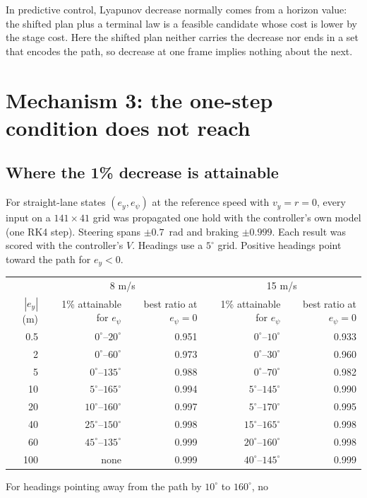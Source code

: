 \documentclass[11pt]{article}
\begin{document}
In predictive control, Lyapunov decrease normally comes from a horizon value:
the shifted plan plus a terminal law is a feasible candidate whose cost is lower
by the stage cost. Here the shifted plan neither carries the decrease nor ends
in a set that encodes the path, so decrease at one frame implies nothing about
the next.

\section{Mechanism 3: the one-step condition does not reach}
\subsection{Where the 1\% decrease is attainable}
For straight-lane states $(e_y,e_\psi)$ at the reference speed with $v_y=r=0$,
every input on a $141\times41$ grid was propagated one hold with the
controller's own model (one RK4 step). Steering spans $\pm0.7$~rad and braking
$\pm0.999$. Each result was scored with the controller's $V$. Headings use a
$5^\circ$ grid. Positive headings point toward the path for $e_y<0$.
\begin{center}\footnotesize
\begin{tabular}{rrrrr}
\toprule
 & \multicolumn{2}{c}{8 m/s} & \multicolumn{2}{c}{15 m/s}\\
$|e_y|$ (m) & 1\% attainable for $e_\psi$ & best ratio at $e_\psi=0$ & 1\% attainable for $e_\psi$ & best ratio at $e_\psi=0$\\
\midrule
0.5 & $0^\circ$--$20^\circ$ & 0.951 & $0^\circ$--$10^\circ$ & 0.933\\
2 & $0^\circ$--$60^\circ$ & 0.973 & $0^\circ$--$30^\circ$ & 0.960\\
5 & $0^\circ$--$135^\circ$ & 0.988 & $0^\circ$--$70^\circ$ & 0.982\\
10 & $5^\circ$--$165^\circ$ & 0.994 & $5^\circ$--$145^\circ$ & 0.990\\
20 & $10^\circ$--$160^\circ$ & 0.997 & $5^\circ$--$170^\circ$ & 0.995\\
40 & $25^\circ$--$150^\circ$ & 0.998 & $15^\circ$--$165^\circ$ & 0.998\\
60 & $45^\circ$--$135^\circ$ & 0.999 & $20^\circ$--$160^\circ$ & 0.998\\
100 & none & 0.999 & $40^\circ$--$145^\circ$ & 0.999\\
\bottomrule
\end{tabular}\end{center}
For headings pointing away from the path by $10^\circ$ to $160^\circ$, no
\end{document}
